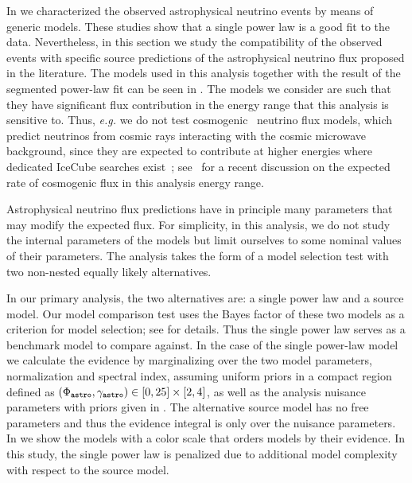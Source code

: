 In  we characterized the observed astrophysical neutrino events by means of generic models.
These studies show that a single power law is a good fit to the data.
Nevertheless, in this section we study the compatibility of the observed events with specific source predictions of the astrophysical neutrino flux proposed in the literature.
The models used in this analysis together with the result of the segmented power-law fit can be seen in .
The models we consider are such that they have significant flux contribution in the energy range that this analysis is sensitive to.
Thus, {\it e.g.} we do not test cosmogenic~\cite{Halzen:1992cz} neutrino flux models, which predict neutrinos from cosmic rays interacting with the cosmic microwave background, since they are expected to contribute at higher energies where dedicated IceCube searches exist~\cite{Aartsen:2018vtx}; see~\cite{Safa:2019ege} for a recent discussion on the expected rate of cosmogenic flux in this analysis energy range.

Astrophysical neutrino flux predictions have in principle many parameters that may modify the expected flux.
For simplicity, in this analysis, we do not study the internal parameters of the models but limit ourselves to some nominal values of their parameters.
The analysis takes the form of a model selection test with two non-nested equally likely alternatives.

In our primary analysis, the two alternatives are: a single power law and a source model.
Our model comparison test uses the Bayes factor of these two models as a criterion for model selection; see  for details.
Thus the single power law serves as a benchmark model to compare against.
In the case of the single power-law model we calculate the evidence by marginalizing over the two model parameters, normalization and spectral index, assuming uniform priors in a compact region defined as $(\Phi_\texttt{astro},\gamma_\texttt{astro}) \in [0, 25]\times [2,4]$, as well as the analysis nuisance parameters with priors given in .
The alternative source model has no free parameters and thus the evidence integral is only over the nuisance parameters.
In  we show the models with a color scale that orders models by their evidence.
In this study, the single power law is penalized due to additional model complexity with respect to the source model.

